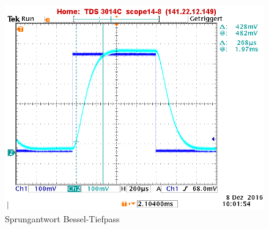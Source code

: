 \begin{figure}[h]
\centering
\includegraphics[width=0.7\linewidth]{Bilder/ImLabor/Sprungantwort_5_1_Bessel_Anstiegszeit}
\caption{Sprungantwort Bessel-Tiefpass}
\label{fig:Sprungantwort_5_1_Bessel_Anstiegszeit}
\end{figure}

\newpage